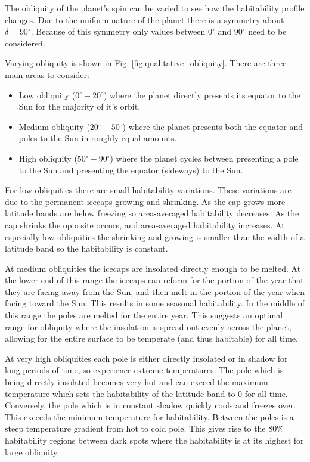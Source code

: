 \documentclass[12pt, onecolumn]{revtex4-2}    %
\newcommand{\degrees}{\ensuremath{^{\circ}}}
\begin{document}
The obliquity of the planet's spin can be varied to see how the habitability profile changes.
Due to the uniform nature of the planet there is a symmetry about $\delta = 90\degrees$.
Because of this symmetry only values between $0\degrees$ and $90\degrees$ need to be considered.

Varying obliquity is shown in Fig. \ref{fig:qualitative_obliquity}.
There are three main areas to consider:
\begin{itemize}
  \item Low obliquity ($0\degrees - 20\degrees$) where the planet directly presents its equator to the Sun for the majority of it's orbit.
  \item Medium obliquity ($20\degrees - 50\degrees$) where the planet presents both the equator and poles to the Sun in roughly equal amounts.
  \item High obliquity ($50\degrees - 90\degrees$) where the planet cycles between presenting a pole to the Sun and presenting the equator (sideways) to the Sun.
\end{itemize}


For low obliquities there are small habitability variations.
These variations are due to the permanent icecaps growing and shrinking.
As the cap grows more latitude bands are below freezing so area-averaged habitability decreases.
As the cap shrinks the opposite occurs, and area-averaged habitability increases.
At especially low obliquities the shrinking and growing is smaller than the width of a latitude band so the habitability is constant.


At medium obliquities the icecaps are insolated directly enough to be melted.
At the lower end of this range the icecaps can reform for the portion of the year that they are facing away from the Sun, and then melt in the portion of the year when facing toward the Sun.
This results in some seasonal habitability.
In the middle of this range the poles are melted for the entire year.
This suggests an optimal range for obliquity where the insolation is spread out evenly across the planet, allowing for the entire surface to be temperate (and thus habitable) for all time.


At very high obliquities each pole is either directly insolated or in shadow for long periods of time, so experience extreme temperatures.
The pole which is being directly insolated becomes very hot and can exceed the maximum temperature which sets the habitability of the latitude band to 0 for all time.
Conversely, the pole which is in constant shadow quickly cools and freezes over. This exceeds the minimum temperature for habitability.
Between the poles is a steep temperature gradient from hot to cold pole.
This gives rise to the 80\% habitability regions between dark spots where the habitability is at its highest for large obliquity.
\end{document}
